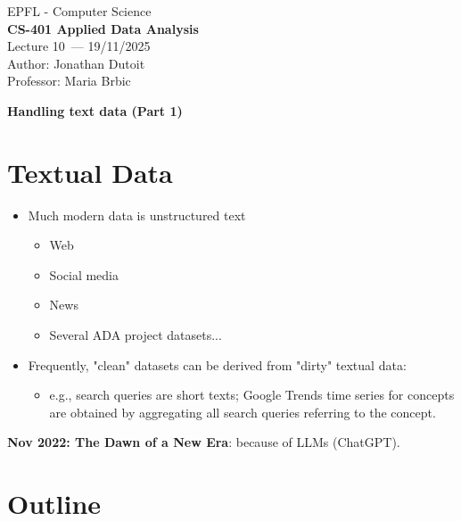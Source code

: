 \documentclass[11pt]{article}
\newcommand{\coursename}{CS-401 Applied Data Analysis}
\newcommand{\lecturenum}{10}
\newcommand{\lecturedate}{19/11/2025}
\newcommand{\professor}{Maria Brbic}
\begin{document}
\begin{center}
  {\large EPFL - Computer Science} \\[0.5em]
  {\Large \textbf{\coursename}} \\[0.5em]
  {\large Lecture \lecturenum\ --- \lecturedate} \\[0.5em]
  {\large Author: Jonathan Dutoit} \\[0.5em]
  {\large Professor: \professor} \\[0.5em]
\end{center}

\vspace{2cm}

\begin{center}
  {\LARGE \textbf{Handling text data (Part 1)}}
\end{center}

\vspace{1cm}

\section*{Textual Data}

\begin{itemize}
	\item Much modern data is unstructured text
		\begin{itemize}
			\item Web
			\item Social media
			\item News
			\item Several ADA project datasets...
		\end{itemize}
	\item Frequently, "clean" datasets can be derived from "dirty" textual data:
		\begin{itemize}
			\item e.g., search queries are short texts; Google Trends time series for concepts are obtained by aggregating all search queries referring to the concept. 
		\end{itemize}
\end{itemize}

\textbf{Nov 2022: The Dawn of a New Era}: because of LLMs (ChatGPT). 

\section*{Outline}
\end{document}
